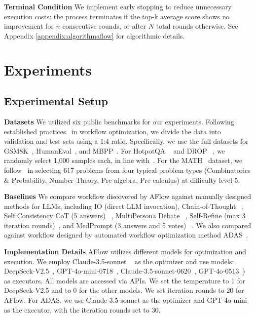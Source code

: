 \documentclass{article} %
\newcommand{\model}{{\sc AFlow}\xspace}
\theoremstyle{plain}
\theoremstyle{definition}
\theoremstyle{remark}
\begin{document}
\textbf{Terminal Condition}
We implement early stopping to reduce unnecessary execution costs: the process terminates if the top-k average score shows no improvement for $n$ consecutive rounds, or after $N$ total rounds otherwise. See Appendix \ref{appendix:algorithmaflow} for algorithmic details.



\section{Experiments}

\subsection{Experimental Setup}
\textbf{Datasets} We utilized six public benchmarks for our experiments. Following established practices~\citep{saad2024archon, hu2024automated} in workflow optimization, we divide the data into validation and test sets using a 1:4 ratio. Specifically, we use the full datasets for GSM8K~\citep{cobbe2021gsm8k}, HumanEval~\citep{Chen2021Humaneval}, and MBPP~\citep{austin2021mbpp}. For HotpotQA ~\citep{zhi2018hot} and DROP ~\citep{dheer2019drop}, we randomly select 1,000 samples each, in line with~\citep{hu2024automated, Noah2023reflexion}. For the MATH~\citep{hendrycks2measuring} dataset, we follow~\citep{hong2024data} in selecting 617 problems from four typical problem types (Combinatorics \& Probability, Number Theory, Pre-algebra, Pre-calculus) at difficulty level 5.

\textbf{Baselines} We compare workflow discovered by \model against manually designed methods for LLMs, including IO (direct LLM invocation), Chain-of-Thought ~\citep{wei2022COT}, Self Consistency CoT (5 answers) ~\citep{wang2022COTSC}, MultiPersona Debate ~\citep{wang2023multipersona}, Self-Refine (max 3 iteration rounds)~\citep{madaan2023self}, and MedPrompt (3 answers and 5 votes) ~\citep{nori2023medprompt}. We also compared against workflow designed by automated workflow optimization method ADAS~\citep{hu2024automated}. 

\textbf{Implementation Details} \model utilizes different models for optimization and execution. We employ Claude-3.5-sonnet ~\citep{sonnet2024anthropic} as the optimizer and use models: DeepSeek-V2.5~\citep{deepseekv252024Deepseek}, GPT-4o-mini-0718~\citep{gpt4omini2024openai}, Claude-3.5-sonnet-0620~\citep{sonnet2024anthropic}, GPT-4o-0513~\citep{gpt4o2024openai}) as executors. All models are accessed via APIs. We set the temperature to 1 for DeepSeek-V2.5 and to 0 for the other models. We set iteration rounds to 20 for \model. For ADAS, we use Claude-3.5-sonnet as the optimizer and GPT-4o-mini as the executor, with the iteration rounds set to 30. 
\end{document}
